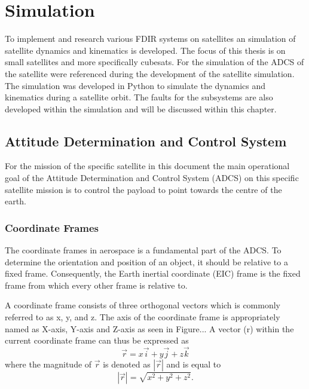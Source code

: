\chapter{Simulation}
\vspace{-2em}
\minitoc
To implement and research various FDIR systems on satellites an simulation of satellite dynamics and kinematics is developed. The focus of this thesis is on small satellites and more specifically cubesats. For the simulation of the ADCS of the satellite \cite{auret2012design, JansevanVuuren2015, Jordaan2016} were referenced during the development of the satellite simulation. The simulation was developed in Python to simulate the dynamics and kinematics during a satellite orbit. The faults for the subsystems are also developed within the simulation and will be discussed within this chapter.

\section{Attitude Determination and Control System}

For the mission of the specific satellite in this document the main operational goal of the Attitude Determination and Control System (ADCS) on this specific satellite mission is to control the payload to point towards the centre of the earth. 

\subsection{Coordinate Frames}
The coordinate frames in aerospace is a fundamental part of the ADCS. To determine the orientation and position of an object, it should be relative to a fixed frame. Consequently, the Earth inertial coordinate (EIC) frame is the fixed frame from which every other frame is relative to.

A coordinate frame consists of three orthogonal vectors which is commonly referred to as x, y, and z. The axis of the coordinate frame is appropriately named as X-axis, Y-axis and Z-axis as seen in Figure... A vector (r) within the current coordinate frame can thus be expressed as 
\begin{equation}
\overrightarrow{r} = x\overrightarrow{i} + y\overrightarrow{j} + z\overrightarrow{k}
\end{equation}
where the magnitude of $\overrightarrow{r}$ is denoted as $|\overrightarrow{r}|$ and is equal to 
\begin{equation}
|\overrightarrow{r}| = \sqrt{x^2 + y^2 + z^2}.
\end{equation}

